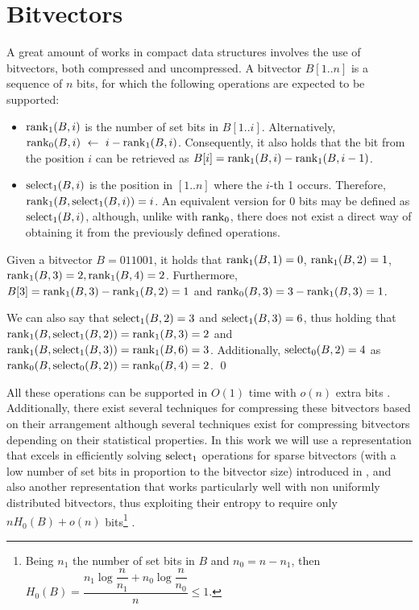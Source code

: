 \documentclass[a4paper,10pt,twoside]{book}
\begin{document}
	\section{Bitvectors}
	\label{sec:bit}
	A great amount of works in compact data structures involves the use of bitvectors, both compressed and uncompressed. A bitvector $B[1..n]$ is a sequence of $n$ bits, for which the following operations are expected to be supported:

    \begin{itemize}
        \item $\operatorname{rank}_1(B,i)$ is the number of set bits in $B[1..i]$. Alternatively, $\operatorname{rank}_0(B,i)~\leftarrow~i - \operatorname{rank}_1(B,i)$. Consequently, it also holds that the bit from the position $i$ can be retrieved as $B[i] = \operatorname{rank}_1(B,i) - \operatorname{rank}_1(B,i-1)$.
        \item $\operatorname{select}_1(B,i)$ is the position in $[1..n]$ where the $i$-th 1 occurs. Therefore, $\operatorname{rank}_1(B,\operatorname{select}_1(B,i)) = i$. An equivalent version for 0 bits may be defined as $\operatorname{select}_1(B,i)$, although, unlike with $\operatorname{rank}_0$, there does not exist a direct way of obtaining it from the previously defined operations.
    \end{itemize}
    
    \begin{example}
        Given a bitvector $B = 011001$, it holds that $\operatorname{rank}_1(B,1) = 0$, $\operatorname{rank}_1(B,2) = 1$, $\operatorname{rank}_1(B,3) = 2, \operatorname{rank}_1(B,4) = 2$. Furthermore, $B[3] = \operatorname{rank}_1(B,3) - \operatorname{rank}_1(B,2) = 1$ and $\operatorname{rank}_0(B,3) = 3 - \operatorname{rank}_1(B,3) = 1$.
        
        We can also say that $\operatorname{select}_1(B,2) = 3$ and $\operatorname{select}_1(B,3) = 6$, thus holding that $\operatorname{rank}_1(B,\operatorname{select}_1(B,2)) = \operatorname{rank}_1(B,3) = 2$ and $\operatorname{rank}_1(B,\operatorname{select}_1(B,3)) = \operatorname{rank}_1(B,6) = 3$. Additionally, $\operatorname{select}_0(B,2) = 4$ as $\operatorname{rank}_0(B,\operatorname{select}_0(B,2)) = \operatorname{rank}_0(B,4) = 2$.
        \qed
    \end{example}
    
    All these operations can be supported in $O(1)$ time with $o(n)$ extra bits \cite{Jac89,Mun96}. 
    Additionally, there exist several techniques for compressing these bitvectors based on their arrangement although several techniques exist for compressing bitvectors depending on their statistical properties. In this work we will use a representation that excels in efficiently solving $\operatorname{select}_1$ operations for sparse bitvectors (with a low number of set bits in proportion to the bitvector size) introduced in \cite{okanohara2007practical}, and also another representation that works particularly well with non uniformly distributed bitvectors, thus exploiting their entropy to require only $nH_0(B) + o(n)$ bits\footnote{Being $n_1$ the number of set bits in $B$ and $n_0 = n - n_1$, then $H_0(B) = \dfrac{n_1\log\dfrac{n}{n_1} + n_0\log\dfrac{n}{n_0}}{n} \leq 1$.} \cite{Raman:2002:SID:545381.545411}.
	
\end{document}
